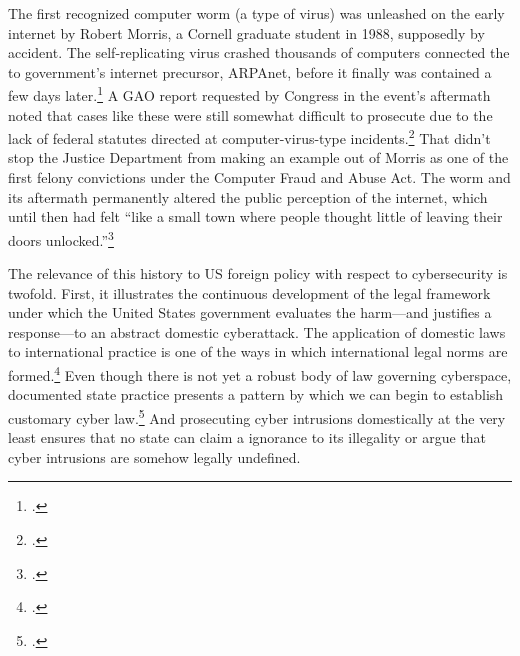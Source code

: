 \documentclass{report}
\begin{document}
\begin{refsegment}
The first recognized computer worm (a type of virus) was unleashed on the early internet by Robert Morris, a Cornell graduate student in 1988, supposedly by accident. The self-replicating virus crashed thousands of computers connected the to government's internet precursor, ARPAnet, before it finally was  contained a few days later.\footcite[This source, a master's thesis for the USAF Air University, makes the dramatic and completely unsubstantiated claim that the Morris worm infected half of of ARPAnet's 88,000 computers. The more popular (and plausible) claim is that of the roughly 60,000 ARPAnet-connected computers, the worm infected 10\% of them, though that number is not particularly well substantiated either.]{moore_conception_2014} A GAO report requested by Congress in the event's aftermath noted that cases like these were still somewhat difficult to prosecute due to the lack of federal statutes directed at computer-virus-type incidents.\footcite{u._s._government_accounting_office_computer_1989} That didn't stop the Justice Department from making an example out of Morris as one of the first felony convictions under the Computer Fraud and Abuse Act. The worm and its aftermath permanently altered the public perception of the internet, which until then had felt ``like a small town where people thought little of leaving their doors unlocked.''\footcite{lee_how_2013}

The relevance of this history to US foreign policy with respect to cybersecurity is twofold. First, it illustrates the continuous development of the legal framework under which the United States government evaluates the harm---and justifies a response---to an abstract domestic cyberattack. The application of domestic laws to international practice is one of the ways in which international legal norms are formed.\footcite[p.~295]{deeks_international_2015}  Even though there is not yet a robust body of law governing cyberspace, documented state practice presents a pattern by which we can begin to establish customary cyber law.\footcite[p.~129]{brown_customary_2012} And prosecuting cyber intrusions domestically at the very least ensures that no state can claim a ignorance to its illegality or argue that cyber intrusions are somehow legally undefined.


\end{refsegment}
\end{document}
